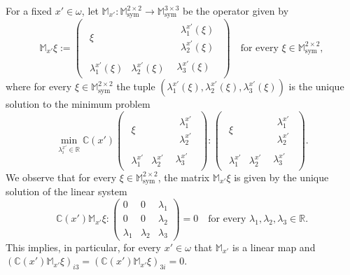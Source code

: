 \documentclass[reqno,10pt]{amsart}
\numberwithin{equation}{section}
\theoremstyle{remark}
\newcommand{\C}{\mathbb{C}}
\newcommand{\M}{\mathbb{M}}
\newcommand{\R}{\mathbb{R}}
\DeclareMathOperator{\sym}{sym}
\begin{document}
For a fixed $x' \in \omega$, let $\M_{x'} : \M^{2 \times 2}_{\sym} \to \M^{3 \times 3}_{\sym}$ be the operator given by
\[
\M_{x'} \xi
:=
\begin{pmatrix} \begin{matrix} \xi \end{matrix} & \begin{matrix} \lambda^{x'}_1(\xi) \\ \lambda^{x'}_2(\xi) \end{matrix} \\ \begin{matrix} \lambda^{x'}_1(\xi) & \lambda^{x'}_2(\xi) \end{matrix} & \lambda^{x'}_3(\xi) \end{pmatrix}
\quad \text{for every }\xi \in \M^{2 \times 2}_{\sym},
\]
where for every $\xi \in \M^{2 \times 2}_{\sym}$ the tuple $(\lambda^{x'}_1(\xi),\lambda^{x'}_2(\xi),\lambda^{x'}_3(\xi))$ is the unique solution to the minimum problem
\begin{equation*}
	\min_{\lambda^{x'}_i \in \R} \C(x') \begin{pmatrix} \begin{matrix} \xi \end{matrix} & \begin{matrix} \lambda^{x'}_1 \\ \lambda^{x'}_2 \end{matrix} \\ \begin{matrix} \lambda^{x'}_1 & \lambda^{x'}_2 \end{matrix} & \lambda^{x'}_3 \end{pmatrix} : \begin{pmatrix} \begin{matrix} \xi \end{matrix} & \begin{matrix} \lambda^{x'}_1 \\ \lambda^{x'}_2 \end{matrix} \\ \begin{matrix} \lambda^{x'}_1 & \lambda^{x'}_2 \end{matrix} & \lambda^{x'}_3 \end{pmatrix}.
\end{equation*}
We observe that for every $\xi \in \M^{2 \times 2}_{\sym}$, the matrix $\M_{x'}\xi$ is given by the unique solution of the linear system
\begin{equation} \label{C tensor KKT condition}
	\C(x') \M_{x'} \xi : \begin{pmatrix} 0 & 0 & \lambda_1 \\ 0 & 0 & \lambda_2 \\ \lambda_1 & \lambda_2 & \lambda_3 \end{pmatrix} = 0 \quad \text{for every } \lambda_1, \lambda_2, \lambda_3 \in \R.
\end{equation}
This implies, in particular, for every $x' \in \omega$ that $\M_{x'}$ is a linear map and
$
(\C(x') \M_{x'} \xi)_{i3} = (\C(x') \M_{x'} \xi)_{3i} = 0.
$
\end{document}
